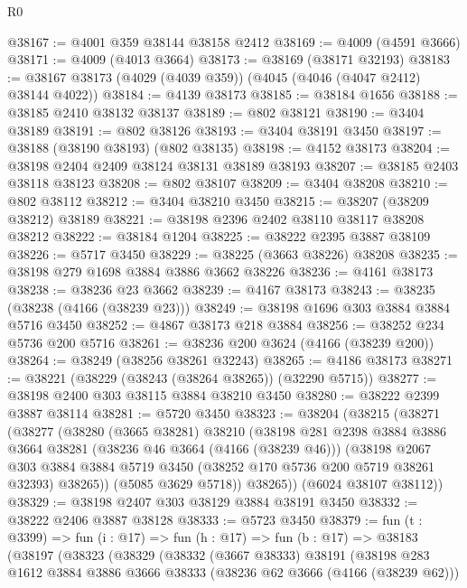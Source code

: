 \begin{lexlean}{R0}
\begin{coremodule}
@38167 := @4001 @359 @38144 @38158 @2412
@38169 := @4009 (@4591 @3666)
@38171 := @4009 (@4013 @3664)
@38173 := @38169 (@38171 @32193)
@38183 := @38167 @38173 (@4029 (@4039 @359)) (@4045 (@4046 (@4047 @2412) @38144 @4022))
@38184 := @4139 @38173
@38185 := @38184 @1656
@38188 := @38185 @2410 @38132 @38137
@38189 := @802 @38121
@38190 := @3404 @38189
@38191 := @802 @38126
@38193 := @3404 @38191 @3450
@38197 := @38188 (@38190 @38193) (@802 @38135)
@38198 := @4152 @38173
@38204 := @38198 @2404 @2409 @38124 @38131 @38189 @38193
@38207 := @38185 @2403 @38118 @38123
@38208 := @802 @38107
@38209 := @3404 @38208
@38210 := @802 @38112
@38212 := @3404 @38210 @3450
@38215 := @38207 (@38209 @38212) @38189
@38221 := @38198 @2396 @2402 @38110 @38117 @38208 @38212
@38222 := @38184 @1204
@38225 := @38222 @2395 @3887 @38109
@38226 := @5717 @3450
@38229 := @38225 (@3663 @38226) @38208
@38235 := @38198 @279 @1698 @3884 @3886 @3662 @38226
@38236 := @4161 @38173
@38238 := @38236 @23 @3662
@38239 := @4167 @38173
@38243 := @38235 (@38238 (@4166 (@38239 @23)))
@38249 := @38198 @1696 @303 @3884 @3884 @5716 @3450
@38252 := @4867 @38173 @218 @3884
@38256 := @38252 @234 @5736 @200 @5716
@38261 := @38236 @200 @3624 (@4166 (@38239 @200))
@38264 := @38249 (@38256 @38261 @32243)
@38265 := @4186 @38173
@38271 := @38221 (@38229 (@38243 (@38264 @38265)) (@32290 @5715))
@38277 := @38198 @2400 @303 @38115 @3884 @38210 @3450
@38280 := @38222 @2399 @3887 @38114
@38281 := @5720 @3450
@38323 := @38204
    (@38215
      (@38271
        (@38277
          (@38280
            (@3665 @38281)
            @38210
            (@38198
              @281
              @2398
              @3884
              @3886
              @3664
              @38281
              (@38236 @46 @3664 (@4166 (@38239 @46)))
              (@38198
                @2067
                @303
                @3884
                @3884
                @5719
                @3450
                (@38252 @170 @5736 @200 @5719 @38261 @32393)
                @38265))
            (@5085 @3629 @5718))
          @38265))
      (@6024 @38107 @38112))
@38329 := @38198 @2407 @303 @38129 @3884 @38191 @3450
@38332 := @38222 @2406 @3887 @38128
@38333 := @5723 @3450
@38379 := fun (t : @3399) =>
  fun (i : @17) =>
  fun (h : @17) =>
  fun (b : @17) =>
  @38183
    (@38197
      (@38323
        (@38329
          (@38332
            (@3667 @38333)
            @38191
            (@38198
              @283
              @1612
              @3884
              @3886
              @3666
              @38333
              (@38236 @62 @3666 (@4166 (@38239 @62)))

\end{coremodule}
\end{lexlean}
